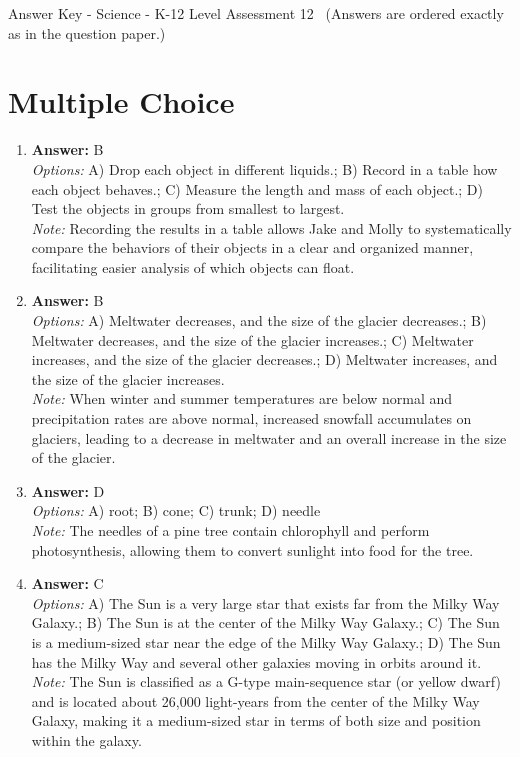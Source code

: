 \documentclass[12pt]{article}
\begin{document}
\begin{center}
Answer Key - Science - K-12 Level Assessment 12 \
\small (Answers are ordered exactly as in the question paper.)
\end{center}

\section*{Multiple Choice}
\begin{enumerate}[label=\arabic*.]
\item \textbf{Answer:} B
\\ \textit{Options:} A) Drop each object in different liquids.; B) Record in a table how each object behaves.; C) Measure the length and mass of each object.; D) Test the objects in groups from smallest to largest.
\\ \textit{Note:} Recording the results in a table allows Jake and Molly to systematically compare the behaviors of their objects in a clear and organized manner, facilitating easier analysis of which objects can float.
\item \textbf{Answer:} B
\\ \textit{Options:} A) Meltwater decreases, and the size of the glacier decreases.; B) Meltwater decreases, and the size of the glacier increases.; C) Meltwater increases, and the size of the glacier decreases.; D) Meltwater increases, and the size of the glacier increases.
\\ \textit{Note:} When winter and summer temperatures are below normal and precipitation rates are above normal, increased snowfall accumulates on glaciers, leading to a decrease in meltwater and an overall increase in the size of the glacier.
\item \textbf{Answer:} D
\\ \textit{Options:} A) root; B) cone; C) trunk; D) needle
\\ \textit{Note:} The needles of a pine tree contain chlorophyll and perform photosynthesis, allowing them to convert sunlight into food for the tree.
\item \textbf{Answer:} C
\\ \textit{Options:} A) The Sun is a very large star that exists far from the Milky Way Galaxy.; B) The Sun is at the center of the Milky Way Galaxy.; C) The Sun is a medium-sized star near the edge of the Milky Way Galaxy.; D) The Sun has the Milky Way and several other galaxies moving in orbits around it.
\\ \textit{Note:} The Sun is classified as a G-type main-sequence star (or yellow dwarf) and is located about 26,000 light-years from the center of the Milky Way Galaxy, making it a medium-sized star in terms of both size and position within the galaxy.

\end{enumerate}
\end{document}
